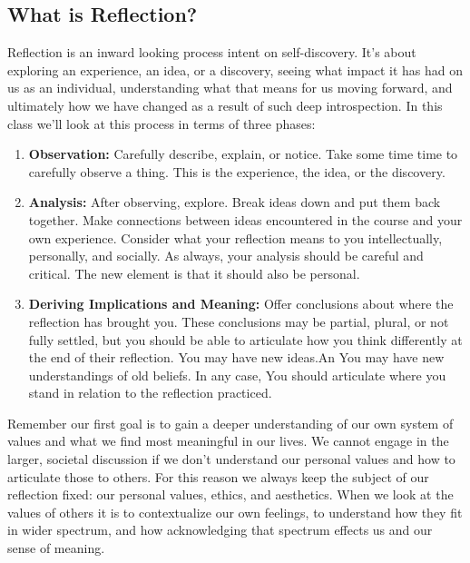 \documentclass[nobib]{tufte-handout}
\begin{document}
\subsection*{What is Reflection?}

Reflection is an inward looking process intent on self-discovery. It's about exploring an experience, an idea, or a discovery, seeing what impact it has had on us as an individual, understanding what that means for us moving forward, and ultimately how we have changed as a result of such deep introspection. In this class we'll look at this process in terms of three phases:
\begin{enumerate}
\item \textbf{Observation:} Carefully describe, explain, or notice. Take some time time to carefully observe a thing. This is the experience, the idea, or the discovery. \newline

\item \textbf{Analysis:} After observing, explore. Break ideas down and put them back together. Make connections between ideas encountered in the course and your own experience. Consider what your reflection means to you intellectually, personally, and socially.  As always, your analysis should be careful and critical. The new element is that it should also be personal.  \newline

\item \textbf{Deriving Implications and Meaning:} Offer conclusions about where the reflection has brought you. These conclusions may be partial, plural, or not fully settled, but you should be able to articulate how you think differently at the end of their reflection. You may have new ideas.An You may have new understandings of old beliefs. In any case, You should articulate where you stand in relation to the reflection practiced.
\end{enumerate}

Remember our first goal is to gain a deeper understanding of our own system of values and what we find most meaningful in our lives. We cannot engage in the larger, societal discussion if we don't understand our personal values and how to articulate those to others. For this reason we always keep the subject of our reflection fixed: our personal values, ethics, and aesthetics. When we look at the values of others it is to contextualize our own feelings, to understand how they fit in wider spectrum, and how acknowledging that spectrum effects us and our sense of
meaning.
\end{document}
